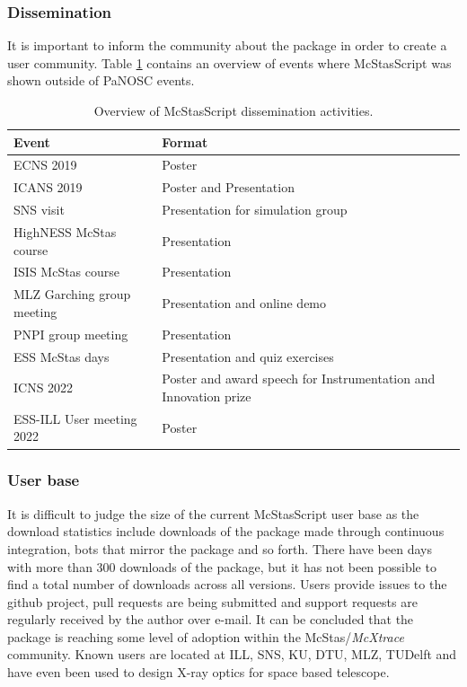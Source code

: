 \documentclass[11pt, a4paper]{article}
\begin{document}
\subsubsection{Dissemination}
It is important to inform the community about the package in order to create a user community. Table \ref{tab:Dissemination} contains an overview of events where McStasScript was shown outside of PaNOSC events.

\begin{table}[h!!!]
\centering
\begin{tabular}{l|l}
Event & Format \\\hline
ECNS 2019 & Poster \\
ICANS 2019 & Poster and Presentation \\
SNS visit & Presentation for simulation group \\
HighNESS McStas course & Presentation \\
ISIS McStas course & Presentation \\
MLZ Garching group meeting & Presentation and online demo \\
PNPI group meeting & Presentation \\
ESS McStas days & Presentation and quiz exercises \\
ICNS 2022 & Poster and award speech for Instrumentation and Innovation prize \\
ESS-ILL User meeting 2022 & Poster \\
\end{tabular}
\caption{\label{tab:Dissemination} Overview of McStasScript dissemination activities.}
\end{table}

\subsubsection{User base}
It is difficult to judge the size of the current McStasScript user base as the download statistics include downloads of the package made through continuous integration, bots that mirror the package and so forth. There have been days with more than 300 downloads of the package, but it has not been possible to find a total number of downloads across all versions. Users provide issues to the github project, pull requests are being submitted and support requests are regularly received by the author over e-mail. It can be concluded that the package is reaching some level of adoption within the McStas/\textit{McXtrace} community. Known users are located at ILL, SNS, KU, DTU, MLZ, TUDelft and have even been used to design X-ray optics for space based telescope.
\end{document}
